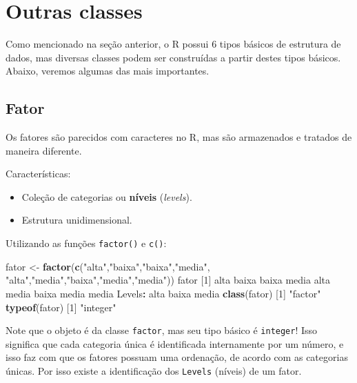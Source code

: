 \documentclass[10pt,a4paper]{book}
\newenvironment{Shaded}{\begin{snugshade}}{\end{snugshade}}
\newcommand{\KeywordTok}[1]{\textcolor[rgb]{0.13,0.29,0.53}{\textbf{#1}}}
\newcommand{\DecValTok}[1]{\textcolor[rgb]{0.00,0.00,0.81}{#1}}
\newcommand{\StringTok}[1]{\textcolor[rgb]{0.31,0.60,0.02}{#1}}
\newcommand{\OperatorTok}[1]{\textcolor[rgb]{0.81,0.36,0.00}{\textbf{#1}}}
\newcommand{\NormalTok}[1]{#1}
\providecommand{\tightlist}{%
  \setlength{\itemsep}{0pt}\setlength{\parskip}{0pt}}
\begin{document}
\section{Outras classes}\label{outras-classes}

Como mencionado na seção anterior, o R possui 6 tipos básicos de
estrutura de dados, mas diversas classes podem ser construídas a partir
destes tipos básicos. Abaixo, veremos algumas das mais importantes.

\subsection{Fator}\label{fator}

Os fatores são parecidos com caracteres no R, mas são armazenados e
tratados de maneira diferente.

Características:

\begin{itemize}
\tightlist
\item
  Coleção de categorias ou \textbf{níveis} (\emph{levels}).
\item
  Estrutura unidimensional.
\end{itemize}

Utilizando as funções \texttt{factor()} e \texttt{c()}:

\begin{Shaded}
\begin{Highlighting}[]
\NormalTok{fator <-}\StringTok{ }\KeywordTok{factor}\NormalTok{(}\KeywordTok{c}\NormalTok{(}\StringTok{"alta"}\NormalTok{,}\StringTok{"baixa"}\NormalTok{,}\StringTok{"baixa"}\NormalTok{,}\StringTok{"media"}\NormalTok{,}
                  \StringTok{"alta"}\NormalTok{,}\StringTok{"media"}\NormalTok{,}\StringTok{"baixa"}\NormalTok{,}\StringTok{"media"}\NormalTok{,}\StringTok{"media"}\NormalTok{))}
\NormalTok{fator}
\NormalTok{[}\DecValTok{1}\NormalTok{] alta  baixa baixa media alta  media baixa media media}
\NormalTok{Levels}\OperatorTok{:}\StringTok{ }\NormalTok{alta baixa media}
\KeywordTok{class}\NormalTok{(fator)}
\NormalTok{[}\DecValTok{1}\NormalTok{] }\StringTok{"factor"}
\KeywordTok{typeof}\NormalTok{(fator)}
\NormalTok{[}\DecValTok{1}\NormalTok{] }\StringTok{"integer"}
\end{Highlighting}
\end{Shaded}

Note que o objeto é da classe \texttt{factor}, mas seu tipo básico é
\texttt{integer}! Isso significa que cada categoria única é identificada
internamente por um número, e isso faz com que os fatores possuam uma
ordenação, de acordo com as categorias únicas. Por isso existe a
identificação dos \texttt{Levels} (níveis) de um fator.
\end{document}
